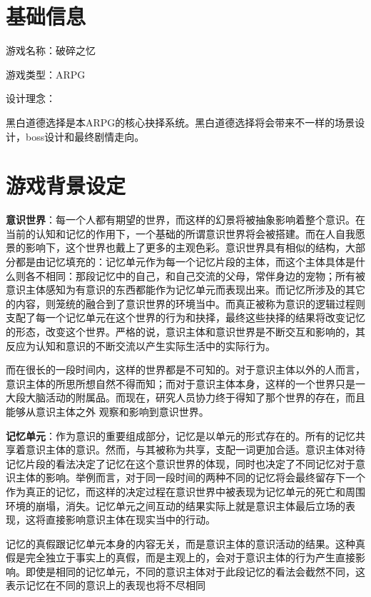\documentclass[12pt, a4paper]{article}
\begin{document}
    \section*{基础信息}
    游戏名称：破碎之忆

    游戏类型：ARPG

    设计理念：
    
        \quad 黑白道德选择是本ARPG的核心抉择系统。黑白道德选择将会带来不一样的场景设计，boss设计和最终剧情走向。
    \newpage 

    \section*{游戏背景设定}
        
        \textbf{意识世界}：每一个人都有期望的世界，而这样的幻景将被抽象影响着整个意识。在当前的认知和记忆的作用下，一个基础的所谓意识世界将会被搭建。而在人自我愿景的影响下，这个世界也戴上了更多的主观色彩。意识世界具有相似的结构，大部分都是由记忆填充的：记忆单元作为每一个记忆片段的主体，而这个主体具体是什么则各不相同：那段记忆中的自己，和自己交流的父母，常伴身边的宠物；所有被意识主体感知为有意识的东西都能作为记忆单元而表现出来。而记忆所涉及的其它的内容，则笼统的融合到了意识世界的环境当中。而真正被称为意识的逻辑过程则支配了每一个记忆单元在这个世界的行为和抉择，最终这些抉择的结果将改变记忆的形态，改变这个世界。严格的说，意识主体和意识世界是不断交互和影响的，其反应为认知和意识的不断交流以产生实际生活中的实际行为。 
        
       而在很长的一段时间内，这样的世界都是不可知的。对于意识主体以外的人而言，意识主体的所思所想自然不得而知；而对于意识主体本身，这样的一个世界只是一大段大脑活动的附属品。而现在，研究人员协力终于得知了那个世界的存在，而且能够从意识主体之外
        观察和影响到意识世界。 

        \medskip
        \textbf{记忆单元}：作为意识的重要组成部分，记忆是以单元的形式存在的。所有的记忆共享着意识主体的意识。然而，与其被称为共享，支配一词更加合适。意识主体对待记忆片段的看法决定了记忆在这个意识世界的体现，同时也决定了不同记忆对于意识主体的影响。举例而言，对于同一段时间的两种不同的记忆将会最终留存下一个作为真正的记忆，而这样的决定过程在意识世界中被表现为记忆单元的死亡和周围环境的崩塌，消失。记忆单元之间互动的结果实际上就是意识主体最后立场的表现，这将直接影响意识主体在现实当中的行动。 

        记忆的真假跟记忆单元本身的内容无关，而是意识主体的意识活动的结果。这种真假是完全独立于事实上的真假，而是主观上的，会对于意识主体的行为产生直接影响。即使是相同的记忆单元，不同的意识主体对于此段记忆的看法会截然不同，这表示记忆在不同的意识上的表现也将不尽相同
\end{document}
